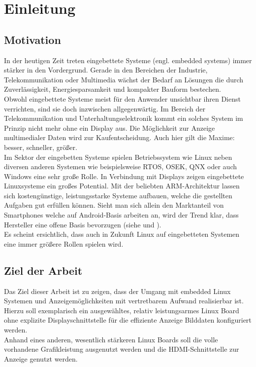 
\chapter{Einleitung}
\label{cha:Einleitung}

\section{Motivation}
In der heutigen Zeit treten eingebettete Systeme (engl. embedded systems) immer stärker in den Vordergrund. Gerade in den Bereichen der Industrie, Telekommunikation oder Multimedia wächst der Bedarf an Lösungen die durch Zuverlässigkeit, Energiesparsamkeit und kompakter Bauform bestechen.\\
Obwohl eingebettete Systeme meist für den Anwender unsichtbar ihren Dienst verrichten, sind sie doch inzwischen allgegenwärtig. Im Bereich der Telekommunikation und Unterhaltungselektronik kommt ein solches System im Prinzip nicht mehr ohne ein Display aus. Die Möglichkeit zur Anzeige multimedialer Daten wird zur Kaufentscheidung. Auch hier gilt die Maxime: besser, schneller, größer.\\
Im Sektor der eingebetten Systeme spielen Betriebssystem wie Linux neben diversen anderen Systemen wie beispielsweise RTOS, OSEK, QNX oder auch Windows eine sehr große Rolle. In Verbindung mit Displays zeigen eingebettete Linuxsysteme ein großes Potential. Mit der beliebten ARM-Architektur lassen sich kostengünstige, leistungsstarke Systeme aufbauen, welche die gestellten Aufgaben gut erfüllen können. Sieht man sich allein den Marktanteil von Smartphones welche auf Android-Basis arbeiten an, wird der Trend klar, dass Hersteller eine offene Basis bevorzugen (siehe \cite{android2014} und \cite{Brandt2013}).\\
Es scheint ersichtlich, dass auch in Zukunft Linux auf eingebetteten Systemen eine immer größere Rollen spielen wird. 

\section{Ziel der Arbeit}
Das Ziel dieser Arbeit ist zu zeigen, dass der Umgang mit embedded Linux Systemen und Anzeigemöglichkeiten mit vertretbarem Aufwand realisierbar ist.\\
Hierzu soll exemplarisch ein ausgewähltes, relativ leistungsarmes Linux Board ohne explizite Displayschnittstelle für die effiziente Anzeige Bilddaten konfiguriert werden.\\
Anhand eines anderen, wesentlich stärkeren Linux Boards soll die volle vorhandene Grafikleistung ausgenutzt werden und die HDMI-Schnittstelle zur Anzeige genutzt werden. 

